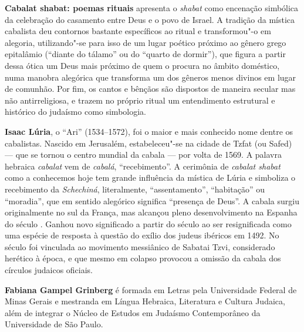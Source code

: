 \textbf{Cabalat shabat: poemas rituais} apresenta o \emph{shabat} como encenação simbólica da celebração do casamento entre Deus e o povo de Israel. A tradição da mística cabalista deu contornos bastante específicos ao ritual e transformou"-o em alegoria, utilizando"-se para isso de um lugar poético próximo ao gênero grego epitalâmio (``diante do tálamo'' ou do ``quarto de dormir''), que figura a partir dessa ótica um Deus mais próximo de quem o procura no âmbito doméstico, numa manobra alegórica que transforma um dos gêneros menos divinos em lugar de comunhão. Por fim, os cantos e bênçãos são dispostos de maneira secular mas não antirreligiosa, e trazem no próprio ritual um entendimento estrutural e histórico do judaísmo como simbologia.

\textbf{Isaac Lúria}, o ``Ari'' (1534--1572), foi o maior e mais conhecido nome dentre os cabalistas. Nascido em Jerusalém, estabeleceu"-se na cidade de Tzfat (ou Safed) --- que se tornou o centro mundial da cabala --- por volta de 1569. A palavra hebraica \emph{cabalat} vem de \emph{cabalá}, ``recebimento''. A cerimônia de \emph{cabalat shabat} como a conhecemos hoje tem grande influência da mística de Lúria e simboliza o recebimento da \emph{Schechiná}, literalmente, ``assentamento'', ``habitação'' ou ``moradia'', que em sentido alegórico significa ``presença de Deus''. A cabala surgiu originalmente no sul da França, mas alcançou pleno desenvolvimento na Espanha do século . Ganhou novo significado a partir do século  ao ser resignificada como uma espécie de resposta à questão do exílio dos judeus ibéricos em 1492. No século  foi vinculada ao movimento messiânico de Sabatai Tzvi, considerado herético à época, e que mesmo em colapso provocou a omissão da cabala dos círculos judaicos oficiais.

\textbf{Fabiana Gampel Grinberg} é formada em Letras pela Universidade Federal de Minas Gerais e mestranda em Língua Hebraica, Literatura e Cultura Judaica, além de integrar o Núcleo de Estudos em Judaísmo Contemporâneo da Universidade de São Paulo.



